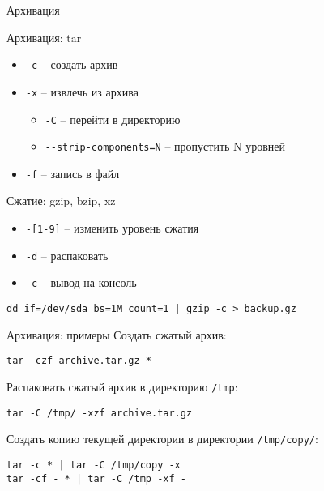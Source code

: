 \begin{frame}[fragile]{Архивация}
	\begin{block}{Архивация: tar}
		\begin{itemize}
			\item {\tt -c} -- создать архив
			\item {\tt -x} -- извлечь из архива
				\begin{itemize}
					\item {\tt -C} -- перейти в директорию
					\item {\tt -{}-strip-components=N} -- пропустить N уровней
				\end{itemize}
			\item {\tt -f} -- запись в файл
		\end{itemize}
	\end{block}

	\begin{block}{Сжатие: gzip, bzip, xz}
		\begin{itemize}
			\item {\tt -[1-9]} -- изменить уровень сжатия
			\item {\tt -d} -- распаковать
			\item {\tt -c} -- вывод на консоль
		\end{itemize}
		\begin{verbatim}
dd if=/dev/sda bs=1M count=1 | gzip -c > backup.gz
    \end{verbatim}
	\end{block}

\end{frame}

\begin{frame}[fragile]{Архивация: примеры}
	Создать сжатый архив:
	\begin{verbatim}
tar -czf archive.tar.gz *
        \end{verbatim}
	\pause
	Распаковать сжатый архив в директорию {\tt /tmp}:
	\begin{verbatim}
tar -C /tmp/ -xzf archive.tar.gz
        \end{verbatim}
	\pause
	Создать копию текущей директории в директории {\tt /tmp/copy/}:
	\begin{verbatim}
tar -c * | tar -C /tmp/copy -x
tar -cf - * | tar -C /tmp -xf -
        \end{verbatim}
\end{frame}
